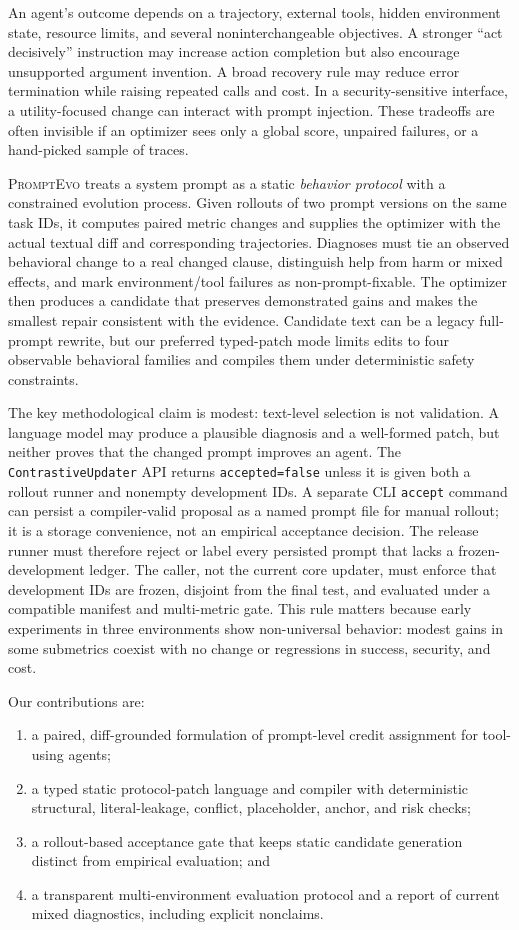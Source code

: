 \documentclass[10pt]{article}
\newcommand{\method}{\textsc{PromptEvo}}
\begin{document}
An agent's outcome depends on a trajectory, external tools, hidden environment state, resource limits, and several noninterchangeable objectives. A stronger ``act decisively'' instruction may increase action completion but also encourage unsupported argument invention. A broad recovery rule may reduce error termination while raising repeated calls and cost. In a security-sensitive interface, a utility-focused change can interact with prompt injection. These tradeoffs are often invisible if an optimizer sees only a global score, unpaired failures, or a hand-picked sample of traces.

\method{} treats a system prompt as a static \emph{behavior protocol} with a constrained evolution process. Given rollouts of two prompt versions on the same task IDs, it computes paired metric changes and supplies the optimizer with the actual textual diff and corresponding trajectories. Diagnoses must tie an observed behavioral change to a real changed clause, distinguish help from harm or mixed effects, and mark environment/tool failures as non-prompt-fixable. The optimizer then produces a candidate that preserves demonstrated gains and makes the smallest repair consistent with the evidence. Candidate text can be a legacy full-prompt rewrite, but our preferred typed-patch mode limits edits to four observable behavioral families and compiles them under deterministic safety constraints.

The key methodological claim is modest: text-level selection is not validation. A language model may produce a plausible diagnosis and a well-formed patch, but neither proves that the changed prompt improves an agent. The \texttt{ContrastiveUpdater} API returns \texttt{accepted=false} unless it is given both a rollout runner and nonempty development IDs. A separate CLI \texttt{accept} command can persist a compiler-valid proposal as a named prompt file for manual rollout; it is a storage convenience, not an empirical acceptance decision. The release runner must therefore reject or label every persisted prompt that lacks a frozen-development ledger. The caller, not the current core updater, must enforce that development IDs are frozen, disjoint from the final test, and evaluated under a compatible manifest and multi-metric gate. This rule matters because early experiments in three environments show non-universal behavior: modest gains in some submetrics coexist with no change or regressions in success, security, and cost.

Our contributions are:
\begin{enumerate}
\item a paired, diff-grounded formulation of prompt-level credit assignment for tool-using agents;
\item a typed static protocol-patch language and compiler with deterministic structural, literal-leakage, conflict, placeholder, anchor, and risk checks;
\item a rollout-based acceptance gate that keeps static candidate generation distinct from empirical evaluation; and
\item a transparent multi-environment evaluation protocol and a report of current mixed diagnostics, including explicit nonclaims.
\end{enumerate}
\end{document}
